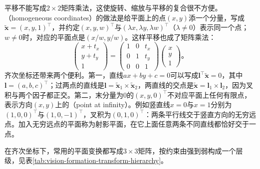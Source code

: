 平移不能写成$2\times2$矩阵乘法，这使旋转、缩放与平移的复合很不方便。（homogeneous coordinates）的做法是给平面上的点$(x,y)$添一个分量，写成$\tilde{\bm x}=(x,y,1)^\top$，并约定$(x,y,w)^\top$与$(\lambda x,\lambda y,\lambda w)^\top$（$\lambda\ne0$）表示同一个点；$w\ne0$时，对应的平面点是$(x/w,y/w)$。这样平移也成了矩阵乘法：
\[
  \begin{pmatrix}x+t_x\\y+t_y\\1\end{pmatrix}
  =\begin{pmatrix}1&0&t_x\\0&1&t_y\\0&0&1\end{pmatrix}
   \begin{pmatrix}x\\y\\1\end{pmatrix}\text{。}
\]
齐次坐标还带来两个便利。第一，直线$ax+by+c=0$可以写成$\bm l^\top\tilde{\bm x}=0$，其中$\bm l=(a,b,c)^\top$；过两点的直线是$\bm l=\tilde{\bm x}_1\times\tilde{\bm x}_2$，两直线的交点是$\tilde{\bm x}=\bm l_1\times\bm l_2$，因为叉积与两个因子都正交。第二，末分量为0的$(x,y,0)^\top$不对应平面上任何有限点，表示方向$(x,y)$上的（point at infinity）。例如竖直线$x=0$与$x=1$分别为$(1,0,0)^\top$与$(1,0,-1)^\top$，叉积为$(0,1,0)^\top$：两条平行线交于竖直方向的无穷远点。加入无穷远点的平面称为射影平面，在它上面任意两条不同直线都恰好交于一点。

在齐次坐标下，常用的平面变换都写成$3\times3$矩阵，按约束由强到弱构成一个层级，见表\ref{tab:vision-formation-transform-hierarchy}。

